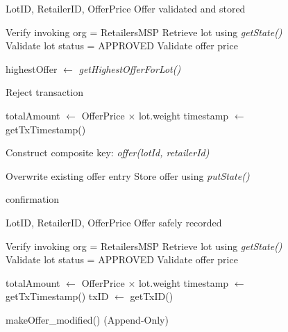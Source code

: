 \documentclass[12pt]{article}
\begin{document}
		\begin{figure}[h]
		\centering
		\caption{Baseline and Modified \texttt{makeOffer()} Algorithms}
		\label{fig:makeoffer_compare}
		
		\begin{minipage}[t]{0.48\linewidth}
			\vspace{0pt}
			\centering
			\begin{algorithm}[H]
				\caption{makeOffer() (Baseline)}
				\begin{algorithmic}[1]
					
					\Require LotID, RetailerID, OfferPrice
					\Ensure Offer validated and stored
					
					\State Verify invoking org = RetailersMSP
					\State Retrieve lot using \textit{getState()}
					\State Validate lot status = APPROVED
					\State Validate offer price
					
					\State highestOffer $\gets$ \textit{getHighestOfferForLot()}
					
					\State Reject transaction
					\EndIf
					
					\State totalAmount $\gets$ OfferPrice $\times$ lot.weight
					\State timestamp $\gets$ getTxTimestamp()
					
					\State Construct composite key: 
					\State \quad \textit{offer(lotId, retailerId)}
					
					\State Overwrite existing offer entry
					\State Store offer using \textit{putState()}
					
					\State \Return confirmation
					
				\end{algorithmic}
			\end{algorithm}
		\end{minipage}
		\hfill
		\begin{minipage}[t]{0.48\linewidth}
			\vspace{0pt}
			\centering
			\begin{algorithm}[H]
				\caption{makeOffer\_modified() (Append-Only)}
				\begin{algorithmic}[1]
					
					\Require LotID, RetailerID, OfferPrice
					\Ensure Offer safely recorded
					
					\State Verify invoking org = RetailersMSP
					\State Retrieve lot using \textit{getState()}
					\State Validate lot status = APPROVED
					\State Validate offer price
					
					\State totalAmount $\gets$ OfferPrice $\times$ lot.weight
					\State timestamp $\gets$ getTxTimestamp()
					\State txID $\gets$ getTxID()
					

\end{algorithmic}
\end{algorithm}
\end{minipage}
\end{figure}
\end{document}

